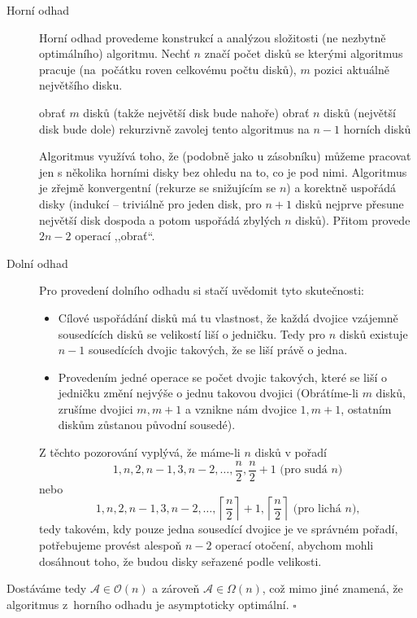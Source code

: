 \documentclass[12pt]{article}
\renewcommand{\O}{\mathcal{O}}
\begin{document}
\begin{description}
\item[Horní odhad] Horní odhad provedeme konstrukcí a analýzou složitosti (ne
nezbytně optimálního) algoritmu. Nechť $n$ značí počet disků se kterými algoritmus
pracuje (na~po\-čá\-tku roven celkovému počtu disků), $m$ pozici aktuálně největšího
disku.\\

\begin{algorithmic}
\RETURN
\ELSE
\STATE obrať $m$ disků (takže největší disk bude nahoře)
\STATE obrať $n$ disků (největší disk bude dole)
\STATE rekurzivně zavolej tento algoritmus na $n-1$ horních disků
\ENDIF
\end{algorithmic}

Algoritmus využívá toho, že (podobně jako u zásobníku) můžeme pracovat jen s
několika horními disky bez ohledu na to, co je pod nimi. Algoritmus je zřejmě
konvergentní (rekurze se snižujícím se $n$) a korektně uspořádá disky
(indukcí -- triviálně pro jeden disk, pro $n+1$ disků nejprve přesune největší
disk dospoda a potom uspořádá zbylých $n$ disků). Přitom provede $2n - 2$
operací ,,obrať``.

\item[Dolní odhad] Pro provedení dolního odhadu si stačí uvědomit tyto
skutečnosti:
\begin{itemize}
\item Cílové uspořádání disků má tu vlastnost, že každá dvojice vzájemně
sousedících disků se velikostí liší o jedničku. Tedy pro $n$ disků existuje
$n-1$ sousedících dvojic takových, že se liší právě o jedna.
\item Provedením jedné operace se počet dvojic takových, které se liší o
jedničku změní nejvýše o jednu takovou dvojici (Obrátíme-li $m$ disků, zrušíme
dvojici $m, m+1$ a vznikne nám dvojice $1, m+1$, ostatním diskům zůstanou
původní sousedé).
\end{itemize}

Z těchto pozorování vyplývá, že máme-li $n$ disků v pořadí
$$1,n,2,n-1,3,n-2,\ldots,\frac{n}{2},\frac{n}{2}+1 \mbox{ (pro sudá $n$)}$$
nebo
$$1,n,2,n-1,3,n-2,\ldots,\left\lceil\frac{n}{2}\right\rceil+1,\left\lceil\frac{n}{2}\right\rceil
\mbox{ (pro lichá $n$),}$$
tedy takovém, kdy pouze jedna sousedící dvojice je ve správném pořadí,
potřebujeme provést alespoň $n-2$ operací otočení, abychom mohli dosáhnout toho,
že budou disky seřazené podle velikosti.

\end{description}

\noindent
Dostáváme tedy $\mathcal{A} \in \O(n)$ a zároveň $\mathcal{A} \in \Omega(n)$, což
mimo jiné znamená, že algoritmus z~horního odhadu je asymptoticky optimální.
\hfill$\square$
\end{document}
